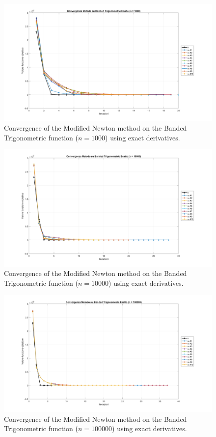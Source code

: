 \documentclass[a4paper,12pt]{article}
\begin{document}
	\begin{figure}[H]%
		\centering
		\includegraphics[width=\textwidth]{../immagini/banded_1k.png}
		\caption{Convergence of the Modified Newton method on the Banded Trigonometric function ($n=1000$) using exact derivatives.}
		\label{fig:bt_1k_exact}
	\end{figure}
	
	\begin{figure}[H]%
		\centering
		\includegraphics[width=\textwidth]{../immagini/banded_10k.png}
		\caption{Convergence of the Modified Newton method on the Banded Trigonometric function ($n=10000$) using exact derivatives.}
		\label{fig:bt_10k_exact}
	\end{figure}
	
	\begin{figure}[H]%
		\centering
		\includegraphics[width=\textwidth]{../immagini/banded_100k.png}
		\caption{Convergence of the Modified Newton method on the Banded Trigonometric function ($n=100000$) using exact derivatives.}
		\label{fig:bt_100k_exact}
	\end{figure}
	
\end{document}

